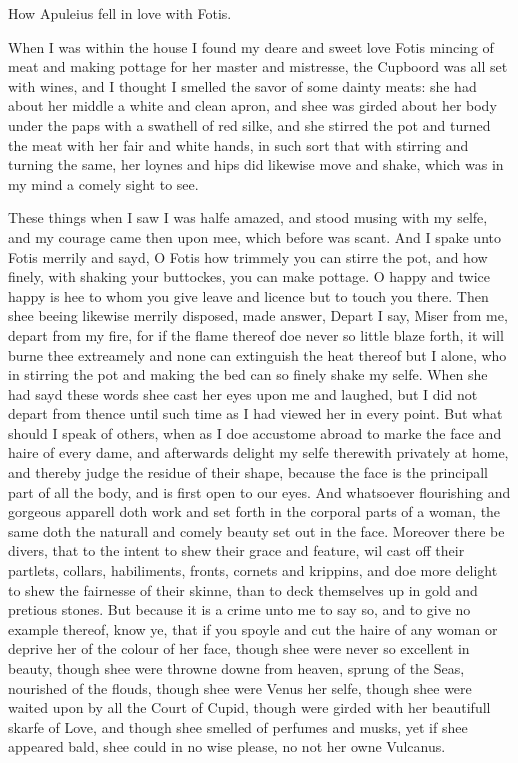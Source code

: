 
How Apuleius fell in love with Fotis.

When I was within the house I found my deare and sweet love Fotis mincing of
meat and making pottage for her master and mistresse, the Cupboord was all set
with wines, and I thought I smelled the savor of some dainty meats: she had
about her middle a white and clean apron, and shee was girded about her body
under the paps with a swathell of red silke, and she stirred the pot and turned
the meat with her fair and white hands, in such sort that with stirring and
turning the same, her loynes and hips did likewise move and shake, which was in
my mind a comely sight to see.

These things when I saw I was halfe amazed, and stood musing with my selfe, and
my courage came then upon mee, which before was scant. And I spake unto Fotis
merrily and sayd, O Fotis how trimmely you can stirre the pot, and how finely,
with shaking your buttockes, you can make pottage. O happy and twice happy is
hee to whom you give leave and licence but to touch you there. Then shee beeing
likewise merrily disposed, made answer, Depart I say, Miser from me, depart
from my fire, for if the flame thereof doe never so little blaze forth, it will
burne thee extreamely and none can extinguish the heat thereof but I alone, who
in stirring the pot and making the bed can so finely shake my selfe. When she
had sayd these words shee cast her eyes upon me and laughed, but I did not
depart from thence until such time as I had viewed her in every point. But what
should I speak of others, when as I doe accustome abroad to marke the face and
haire of every dame, and afterwards delight my selfe therewith privately at
home, and thereby judge the residue of their shape, because the face is the
principall part of all the body, and is first open to our eyes. And whatsoever
flourishing and gorgeous apparell doth work and set forth in the corporal parts
of a woman, the same doth the naturall and comely beauty set out in the face.
Moreover there be divers, that to the intent to shew their grace and feature,
wil cast off their partlets, collars, habiliments, fronts, cornets and
krippins, and doe more delight to shew the fairnesse of their skinne, than to
deck themselves up in gold and pretious stones. But because it is a crime unto
me to say so, and to give no example thereof, know ye, that if you spoyle and
cut the haire of any woman or deprive her of the colour of her face, though
shee were never so excellent in beauty, though shee were throwne downe from
heaven, sprung of the Seas, nourished of the flouds, though shee were Venus her
selfe, though shee were waited upon by all the Court of Cupid, though were
girded with her beautifull skarfe of Love, and though shee smelled of perfumes
and musks, yet if shee appeared bald, shee could in no wise please, no not her
owne Vulcanus.

